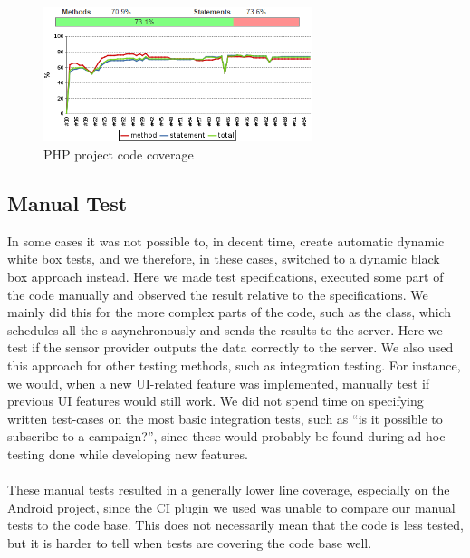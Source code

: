 \begin{figure}[!htbp]
    \centering
    \includegraphics[width=0.7\textwidth]{graphic/quality_assurance/jenkins_php_code_coverage}
    \caption{PHP project code coverage}
    \label{fig:php_project_code_coverage}
\end{figure}
\FloatBarrier

\subsection{Manual Test}
In some cases it was not possible to, in decent time, create automatic dynamic white box tests, and we therefore, in these cases, switched to a dynamic black box approach instead. Here we made test specifications, executed some part of the code manually and observed the result relative to the specifications. We mainly did this for the more complex parts of the code, such as the  class, which schedules all the s asynchronously and sends the results to the server. Here we test if the sensor provider outputs the data correctly to the server. We also used this approach for other testing methods, such as integration testing. For instance, we would, when a new UI-related feature was implemented, manually test if previous UI features would still work. We did not spend time on specifying written test-cases on the most basic integration tests, such as ``is it possible to subscribe to a campaign?'', since these would probably be found during ad-hoc testing done while developing new features.
\\\\
These manual tests resulted in a generally lower line coverage, especially on the Android project, since the CI plugin we used was unable to compare our manual tests to the code base. This does not necessarily mean that the code is less tested, but it is harder to tell when tests are covering the code base well. 